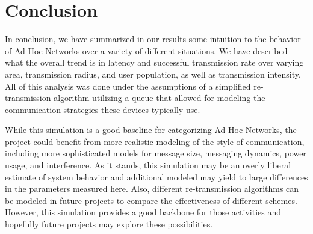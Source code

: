 \section{Conclusion}

In conclusion, we have summarized in our results some intuition to the behavior of Ad-Hoc Networks
over a variety of different situations.
We have described what the overall trend is in latency and successful transmission rate
over varying area, transmission radius, and user population, as well as transmission intensity.
All of this analysis was done under the assumptions of a simplified re-transmission algorithm
utilizing a queue that allowed for modeling the communication strategies these devices typically
use.

While this simulation is a good baseline for categorizing Ad-Hoc Networks, the project could
benefit from more realistic modeling of the style of communication, including more sophisticated
models for message size, messaging dynamics, power usage, and interference.
As it stands, this simulation may be an overly liberal estimate of system behavior and additional
modeled may yield to large differences in the parameters measured here.
Also, different re-transmission algorithms can be modeled in future projects to compare
the effectiveness of different schemes.
However, this simulation provides a good backbone for those activities and hopefully future
projects may explore these possibilities.
